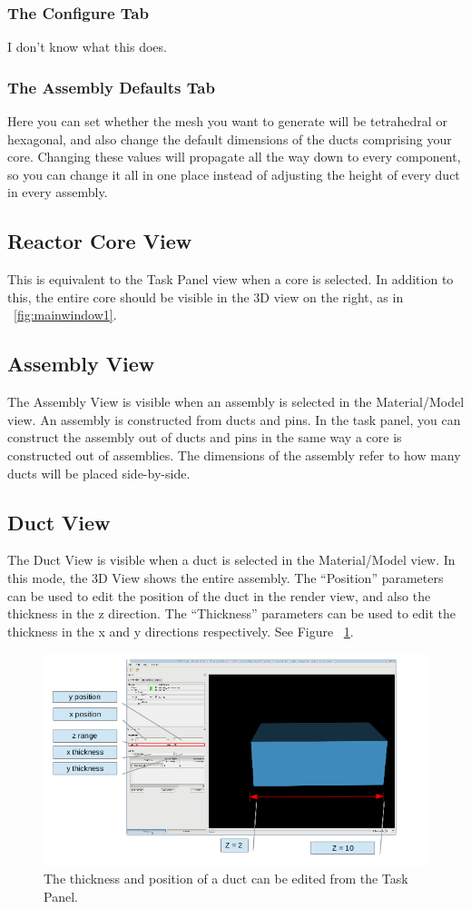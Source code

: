 \subsubsection{The Configure Tab}
I don't know what this does.

\subsubsection{The Assembly Defaults Tab}
Here you can set whether the mesh you want to generate will be tetrahedral or hexagonal, and also change the default dimensions of the ducts comprising your core.  Changing these values will propagate all the way down to every component, so you can change it all in one place instead of adjusting the height of every duct in every assembly.

\subsection{Reactor Core View}
This is equivalent to the Task Panel view when a core is selected.  In addition to this, the entire core should be visible in the 3D view on the right, as in ~\ref{fig:mainwindow1}.

\subsection{Assembly View}
The Assembly View is visible when an assembly is selected in the Material/Model view.  An assembly is constructed from ducts and pins.  In the task panel, you can construct the assembly out of ducts and pins in the same way a core is constructed out of assemblies.  The dimensions of the assembly refer to how many ducts will be placed side-by-side.

\subsection{Duct View}
The Duct View is visible when a duct is selected in the Material/Model view.  In this mode, the 3D View shows the entire assembly.  The ``Position'' parameters can be used to edit the position of the duct in the render view, and also the thickness in the z direction.  The ``Thickness'' parameters can be used to edit the thickness in the x and y directions respectively. See Figure ~\ref{fig:ductedit1}.

\begin{figure}
\begin{center}
\includegraphics[width=0.6\linewidth]{Images/duct-editing-labeled.png}
\caption{The thickness and position of a duct can be edited from the Task Panel.}
\label{fig:ductedit1}
\end{center}
\end{figure}

